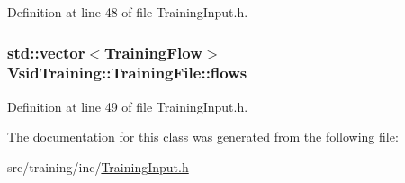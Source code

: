 Definition at line 48 of file Training\-Input.\-h.

\hypertarget{class_vsid_training_1_1_training_file_aaaa833a3a302e0abe9bd081abd4b7867}{
\subsubsection[{flows}]{\setlength{\rightskip}{0pt plus 5cm}std\-::vector$<${\bf Training\-Flow}$>$ Vsid\-Training\-::\-Training\-File\-::flows}}\label{class_vsid_training_1_1_training_file_aaaa833a3a302e0abe9bd081abd4b7867}


Definition at line 49 of file Training\-Input.\-h.



The documentation for this class was generated from the following file\-:\begin{DoxyCompactItemize}
\item 
src/training/inc/\hyperlink{_training_input_8h}{Training\-Input.\-h}\end{DoxyCompactItemize}
